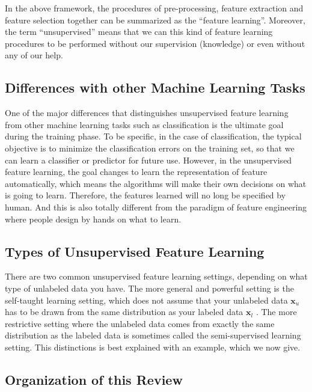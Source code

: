 \documentclass[conference]{IEEEtran}
\begin{document}
In the above framework, the procedures of pre-processing, feature extraction and feature selection together can be summarized as the ``feature learning''.
Moreover, the term ``unsupervised'' means that we can this kind of feature learning procedures to be performed without our supervision (knowledge) or even without any of our help.

\subsection{Differences with other Machine Learning Tasks}



One of the major differences that distinguishes unsupervised feature learning from other machine learning tasks such as classification is the ultimate goal during the training phase. To be specific, in the case of classification, the typical objective is to minimize the classification errors on the training set, so that we can learn a classifier or predictor for future use. However, in the unsupervised feature learning, the goal changes to learn the representation of feature automatically, which means the algorithms will make their own decisions on what is going to learn. Therefore, the features learned will no long be specified by human. And this is also totally different from the paradigm of feature engineering where people design by hands on what to learn.

\subsection{Types of Unsupervised Feature Learning}

There are two common unsupervised feature learning settings, depending on what type of unlabeled data you have. The more general and powerful setting is the self-taught learning setting, which does not assume that your unlabeled data $\mathbf{x}_u$ has to be drawn from the same distribution as your labeled data $\mathbf{x}_l$ \cite{self_taught}. The more restrictive setting where the unlabeled data comes from exactly the same distribution as the labeled data is sometimes called the semi-supervised learning setting. This distinctions is best explained with an example, which we now give.

\subsection{Organization of this Review}
\end{document}
